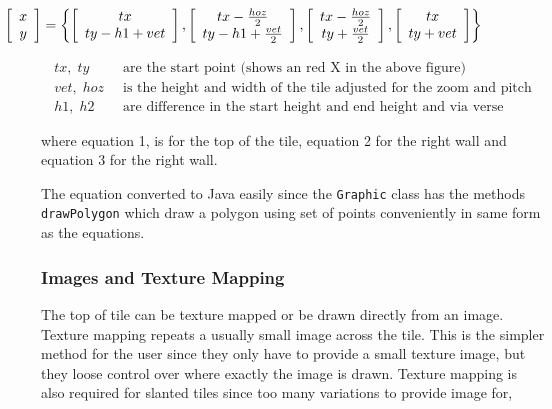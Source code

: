 \begin{equation}
\hspace{-2.5cm} \left[ \begin{array}{c} x \\ y \end{array} \right]=\left\{ \left[ \begin{array}{c} tx \\ ty-h1+vet \end{array} \right],\left[ \begin{array}{c} tx-\frac{hoz}{2} \\ ty-h1+\frac{vet}{2} \end{array} \right],\left[ \begin{array}{c} tx-\frac{hoz}{2} \\ ty+\frac{vet}{2} \end{array} \right],\left[ \begin{array}{c} tx \\ ty+vet \end{array} \right] \right\}
\end{equation}

\begin{align*}
	tx,\; ty   &\;\; \textrm{are the start point (shows an red X in the above figure)}\\
	vet,\; hoz &\;\; \textrm{is the height and width of the tile adjusted for  the zoom and pitch}\\
	h1,\; h2   &\;\; \textrm{are difference in the start height and end height and via verse}
\end{align*}

where equation 1, is for the top of the tile, equation 2 for the right wall and equation 3 for the right wall. 

The equation converted to Java easily since the \texttt{Graphic} class has the methods  \texttt{drawPolygon} which draw a polygon using set of points conveniently in same form as the equations.

\subsubsection{Images and Texture Mapping}
The top of tile can be texture mapped or be drawn directly from an image.  Texture mapping repeats a usually small image across the tile. This is the simpler method for the user since they only have to provide a small texture image, but they loose control over where exactly the image is drawn.  Texture mapping is also required for slanted tiles since too many variations to provide image for,

